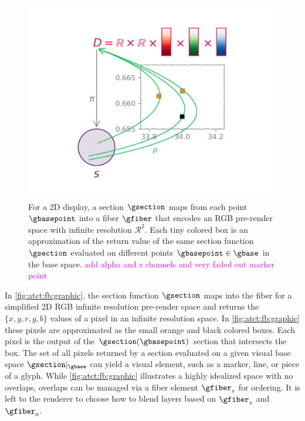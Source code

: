 \documentclass[journal]{IEEEtran}
\newcommand{\note}[1]{\textcolor{magenta}{#1}}
\theoremstyle{definition}
\theoremstyle{remark}
\begin{document}
\begin{figure}[H]
  \includegraphics[width=1\columnwidth]{fb_rho.png}
  \caption{For a 2D display, a section $\gsection$ maps from each point $\gbasepoint$ into a fiber $\gfiber$ that encodes an RGB pre-render space with infinite resolution $\mathcal{R}^{2}$. Each tiny colored box is an approximation of the return value of the same section function $\gsection$ evaluated on different points $\gbasepoint \in \gbase$ in the base space. \note{add alpha and z channels and very faded out marker point}
  \label{fig:atct:fb:graphic}}
\end{figure}

In \autoref{fig:atct:fb:graphic}, the section function $\gsection$ maps into the fiber for a simplified 2D RGB infinite resolution pre-render space and returns the $\{x,y,r,g,b\}$ values of a pixel in an infinite resolution space. In \autoref{fig:atct:fb:graphic} these pixels are approximated as the small orange and black colored boxes. Each pixel is the output of the $\gsection(\gbasepoint)$ section that intersects the box. The set of all pixels returned by a section evaluated on a given visual base space $\gsection|_{\gbase}$ can yield a visual element, such as a marker, line, or piece of a glyph. While \autoref{fig:atct:fb:graphic} illustrates a highly idealized space with no overlaps, overlaps can be managed via a fiber element $\gfiber_{z}$ for ordering. It is left to the renderer to choose how to blend layers based on $\gfiber_{z}$ and $\gfiber_{a}$.
\end{document}
